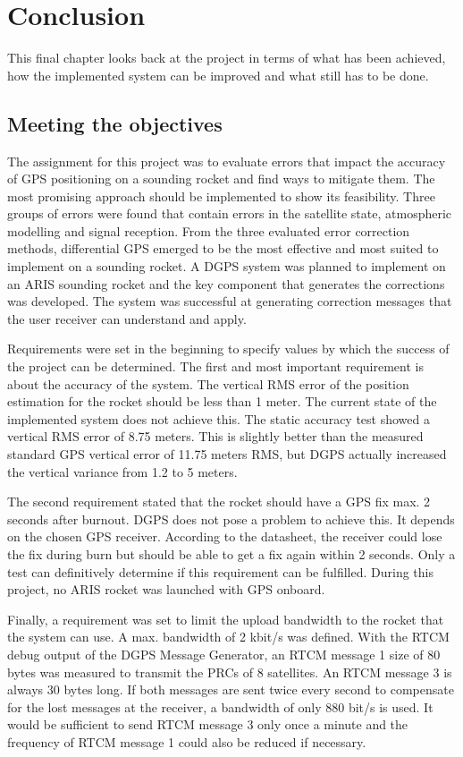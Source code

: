 \chapter{Conclusion}

This final chapter looks back at the project in terms of what has been achieved, how the implemented system can be improved and what still has to be done.


\section{Meeting the objectives}

The assignment for this project was to evaluate errors that impact the accuracy of GPS positioning on a sounding rocket and find ways to mitigate them.
The most promising approach should be implemented to show its feasibility.
Three groups of errors were found that contain errors in the satellite state, atmospheric modelling and signal reception.
From the three evaluated error correction methods, differential GPS emerged to be the most effective and most suited to implement on a sounding rocket.
A DGPS system was planned to implement on an ARIS sounding rocket and the key component that generates the corrections was developed.
The system was successful at generating correction messages that the user receiver can understand and apply.

Requirements were set in the beginning to specify values by which the success of the project can be determined.
The first and most important requirement is about the accuracy of the system.
The vertical RMS error of the position estimation for the rocket should be less than 1 meter.
The current state of the implemented system does not achieve this.
The static accuracy test showed a vertical RMS error of 8.75 meters.
This is slightly better than the measured standard GPS vertical error of 11.75 meters RMS, but DGPS actually increased the vertical variance from 1.2 to 5 meters.

The second requirement stated that the rocket should have a GPS fix max. 2 seconds after burnout.
DGPS does not pose a problem to achieve this.
It depends on the chosen GPS receiver.
According to the datasheet, the receiver could lose the fix during burn but should be able to get a fix again within 2 seconds.
Only a test can definitively determine if this requirement can be fulfilled.
During this project, no ARIS rocket was launched with GPS onboard.

Finally, a requirement was set to limit the upload bandwidth to the rocket that the system can use.
A max. bandwidth of 2 kbit/s was defined.
With the RTCM debug output of the DGPS Message Generator, an RTCM message 1 size of 80 bytes was measured to transmit the PRCs of 8 satellites.
An RTCM message 3 is always 30 bytes long.
If both messages are sent twice every second to compensate for the lost messages at the receiver, a bandwidth of only 880 bit/s is used.
It would be sufficient to send RTCM message 3 only once a minute and the frequency of RTCM message 1 could also be reduced if necessary.



